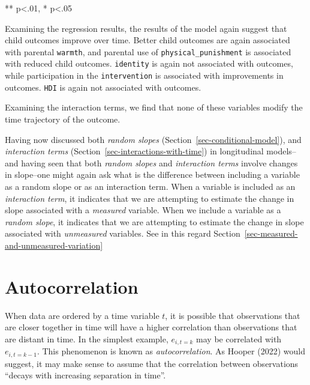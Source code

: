 \documentclass[
  letterpaper,
  DIV=11,
  numbers=noendperiod]{scrreprt}
\begin{document}
** p\textless.01, * p\textless.05

Examining the regression results, the results of the model again suggest
that child outcomes improve over time. Better child outcomes are again
associated with parental \texttt{warmth}, and parental use of
\texttt{physical\_punishment} is associated with reduced child outcomes.
\texttt{identity} is again not associated with outcomes, while
participation in the \texttt{intervention} is associated with
improvements in outcomes. \texttt{HDI} is again not associated with
outcomes.

Examining the interaction terms, we find that none of these variables
modify the time trajectory of the outcome.

\begin{tcolorbox}[enhanced jigsaw, coltitle=black, titlerule=0mm, colframe=quarto-callout-tip-color-frame, opacitybacktitle=0.6, toprule=.15mm, colback=white, bottomrule=.15mm, opacityback=0, breakable, title=\textcolor{quarto-callout-tip-color}{\faLightbulb}\hspace{0.5em}{Interactions And Random Slopes in Longitudinal Models}, bottomtitle=1mm, toptitle=1mm, arc=.35mm, leftrule=.75mm, colbacktitle=quarto-callout-tip-color!10!white, rightrule=.15mm, left=2mm]

Having now discussed both \emph{random slopes}
(Section~\ref{sec-conditional-model}), and \emph{interaction terms}
(Section~\ref{sec-interactions-with-time}) in longitudinal models--and
having seen that both \emph{random slopes} and \emph{interaction terms}
involve changes in slope--one might again ask what is the difference
between including a variable as a random slope or as an interaction
term. When a variable is included as an \emph{interaction term}, it
indicates that we are attempting to estimate the change in slope
associated with a \emph{measured} variable. When we include a variable
as a \emph{random slope}, it indicates that we are attempting to
estimate the change in slope associated with \emph{unmeasured}
variables. See in this regard
Section~\ref{sec-measured-and-unmeasured-variation}

\end{tcolorbox}

\section{Autocorrelation}\label{autocorrelation}

When data are ordered by a time variable \(t\), it is possible that
observations that are closer together in time will have a higher
correlation than observations that are distant in time. In the simplest
example, \(e_{i, t=k}\) may be correlated with \(e_{i, t=k-1}\). This
phenomenon is known as \emph{autocorrelation}. As Hooper (2022) would
suggest, it may make sense to assume that the correlation between
observations ``decays with increasing separation in time''.
\end{document}
